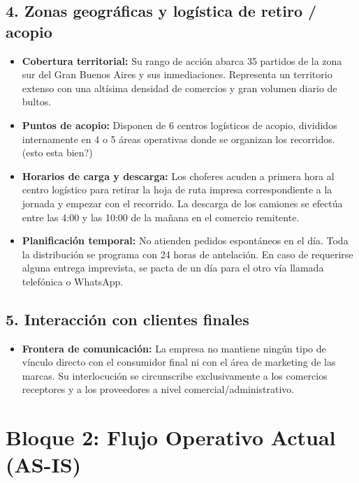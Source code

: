 \documentclass[11pt,a4paper]{article}
\begin{document}
\subsection*{4. Zonas geográficas y logística de retiro / acopio}
\begin{itemize}
  \item \textbf{Cobertura territorial:} Su rango de acción abarca 35 partidos de la zona sur del Gran Buenos Aires y sus inmediaciones. Representa un territorio extenso con una altísima densidad de comercios y gran volumen diario de bultos.
  \item \textbf{Puntos de acopio:} Disponen de 6 centros logísticos de acopio, divididos internamente en 4 o 5 áreas operativas donde se organizan los recorridos. (esto esta bien?)
  \item \textbf{Horarios de carga y descarga:} Los choferes acuden a primera hora al centro logístico para retirar la hoja de ruta impresa correspondiente a la jornada y empezar con el recorrido. La descarga de los camiones se efectúa entre las 4:00 y las 10:00 de la mañana en el comercio remitente.
  \item \textbf{Planificación temporal:} No atienden pedidos espontáneos en el día. Toda la distribución se programa con 24 horas de antelación. En caso de requerirse alguna entrega imprevista, se pacta de un día para el otro vía llamada telefónica o WhatsApp.
\end{itemize}

\subsection*{5. Interacción con clientes finales}
\begin{itemize}
  \item \textbf{Frontera de comunicación:} La empresa no mantiene ningún tipo de vínculo directo con el consumidor final ni con el área de marketing de las marcas. Su interlocución se circunscribe exclusivamente a los comercios receptores y a los proveedores a nivel comercial/administrativo.
\end{itemize}

\section*{Bloque 2: Flujo Operativo Actual (AS-IS)}
\end{document}
